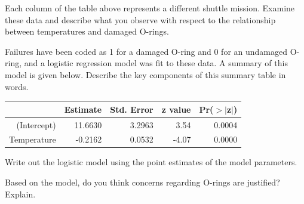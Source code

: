 {\begin{parts}
\item Each column of the table above represents a different shuttle mission. 
Examine these data and describe what you observe with respect to the 
relationship between temperatures and damaged O-rings.
\item Failures have been coded as 1 for a damaged O-ring and 0 for an 
undamaged O-ring, and a logistic regression model was fit to these data. A 
summary of this model is given below. Describe the key components of this 
summary table in words.
\begin{center}
\begin{tabular}{rrrrr}
  \hline
            & Estimate & Std. Error & z value   & Pr($>$$|$z$|$) \\ 
  \hline
(Intercept) & 11.6630  & 3.2963     & 3.54      & 0.0004 \\ 
Temperature & -0.2162  & 0.0532     & -4.07     & 0.0000 \\ 
  \hline
\end{tabular}
\end{center}
\item Write out the logistic model using the point estimates of the model 
parameters.
\item Based on the model, do you think concerns regarding O-rings are 
justified? Explain.
\end{parts}
}{}


